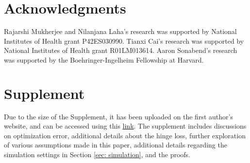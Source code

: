 \documentclass[preprint] {imsart}
\begin{document}
     
 \section{Acknowledgments}
Rajarshi Mukherjee and Nilanjana Laha's research was supported by National Institutes of Health grant P42ES030990.  Tianxi Cai's research was supported by National Institutes of Health grant R01LM013614. Aaron Sonabend's research was supported by the Boehringer-Ingelheim Fellowship at Harvard. 

  \section{Supplement}
  Due to the size of the Supplement, it has been uploaded  on the first  author's website, and can be accessed using this  \href{https://sites.google.com/d/1KLrABaa49Yb-z0SjeUPxUruj69ktBCEQ/p/1FuwCoWWhBXb2DfKg5E0UiFOu8xYVHxKJ/edit}{link}.
  The supplement includes discussions on optimization error, additional details about the hinge loss, further exploration of various assumptions made in this paper, additional details regarding the simulation settings in Section \ref{sec: simulation}, and the proofs.

 

\end{document}
